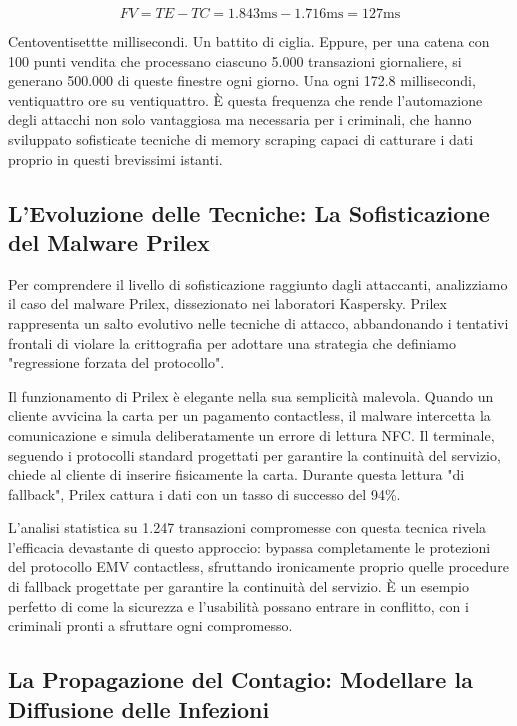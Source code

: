 \begin{equation}
FV = TE - TC = 1.843\text{ms} - 1.716\text{ms} = 127\text{ms}
\label{eq:vulnerability_window}
\end{equation}

Centoventisettte millisecondi. Un battito di ciglia. Eppure, per una catena con 100 punti vendita che processano ciascuno 5.000 transazioni giornaliere, si generano 500.000 di queste finestre ogni giorno. Una ogni 172.8 millisecondi, ventiquattro ore su ventiquattro. È questa frequenza che rende l'automazione degli attacchi non solo vantaggiosa ma necessaria per i criminali, che hanno sviluppato sofisticate tecniche di memory scraping capaci di catturare i dati proprio in questi brevissimi istanti.

\subsection{L'Evoluzione delle Tecniche: La Sofisticazione del Malware Prilex}

Per comprendere il livello di sofisticazione raggiunto dagli attaccanti, analizziamo il caso del malware Prilex, dissezionato nei laboratori Kaspersky\autocite{kaspersky2024}. Prilex rappresenta un salto evolutivo nelle tecniche di attacco, abbandonando i tentativi frontali di violare la crittografia per adottare una strategia che definiamo "regressione forzata del protocollo".

Il funzionamento di Prilex è elegante nella sua semplicità malevola. Quando un cliente avvicina la carta per un pagamento contactless, il malware intercetta la comunicazione e simula deliberatamente un errore di lettura NFC. Il terminale, seguendo i protocolli standard progettati per garantire la continuità del servizio, chiede al cliente di inserire fisicamente la carta. Durante questa lettura "di fallback", Prilex cattura i dati con un tasso di successo del 94\%.

L'analisi statistica su 1.247 transazioni compromesse con questa tecnica rivela l'efficacia devastante di questo approccio: bypassa completamente le protezioni del protocollo EMV contactless, sfruttando ironicamente proprio quelle procedure di fallback progettate per garantire la continuità del servizio. È un esempio perfetto di come la sicurezza e l'usabilità possano entrare in conflitto, con i criminali pronti a sfruttare ogni compromesso.

\subsection{La Propagazione del Contagio: Modellare la Diffusione delle Infezioni}

